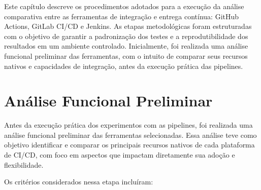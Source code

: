 Este capítulo descreve os procedimentos adotados para a execução da análise comparativa entre as ferramentas de integração e entrega contínua: GitHub Actions, GitLab CI/CD e Jenkins. As etapas metodológicas foram estruturadas com o objetivo de garantir a padronização dos testes e a reprodutibilidade dos resultados em um ambiente controlado. Inicialmente, foi realizada uma análise funcional preliminar das ferramentas, com o intuito de comparar seus recursos nativos e capacidades de integração, antes da execução prática das pipelines.

\section{Análise Funcional Preliminar}

Antes da execução prática dos experimentos com as pipelines, foi realizada uma análise funcional preliminar das ferramentas selecionadas. Essa análise teve como objetivo identificar e comparar os principais recursos nativos de cada plataforma de CI/CD, com foco em aspectos que impactam diretamente sua adoção e flexibilidade.

Os critérios considerados nessa etapa incluíram:

